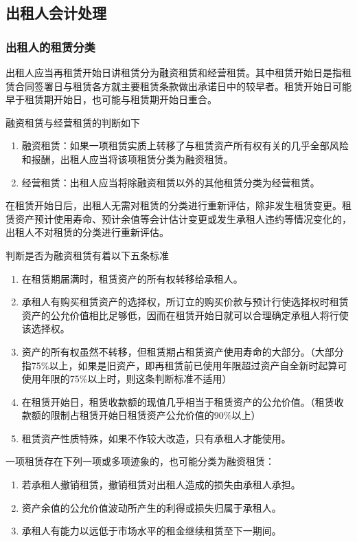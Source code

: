 \documentclass[UTF8,12pt]{ctexart}
\numberwithin{equation}{section} %
\numberwithin{figure}{section}
\numberwithin{table}{section}
\begin{document}
	\subsection{出租人会计处理}
	\subsubsection{出租人的租赁分类}
	出租人应当再租赁开始日讲租赁分为融资租赁和经营租赁。其中租赁开始日是指租赁合同签署日与租赁各方就主要租赁条款做出承诺日中的较早者。租赁开始日可能早于租赁期开始日，也可能与租赁期开始日重合。
	
	融资租赁与经营租赁的判断如下
	\begin{enumerate}
		\item 融资租赁：如果一项租赁实质上转移了与租赁资产所有权有关的几乎全部风险和报酬，出租人应当将该项租赁分类为融资租赁。
		
		\item 经营租赁：出租人应当将除融资租赁以外的其他租赁分类为经营租赁。
	\end{enumerate}
	在租赁开始日后，出租人无需对租赁的分类进行重新评估，除非发生租赁变更。租赁资产预计使用寿命、预计余值等会计估计变更或发生承租人违约等情况变化的，出租人不对租赁的分类进行重新评估。
	
	判断是否为融资租赁有着以下五条标准
	\begin{enumerate}
		\item 在租赁期届满时，租赁资产的所有权转移给承租人。
		
		\item 承租人有购买租赁资产的选择权，所订立的购买价款与预计行使选择权时租赁资产的公允价值相比足够低，因而在租赁开始日就可以合理确定承租人将行使该选择权。
		
		\item 资产的所有权虽然不转移，但租赁期占租赁资产使用寿命的大部分。（大部分指75\%以上，如果是旧资产，即再租赁前已使用年限超过资产自全新时起算可使用年限的75\%以上时，则这条判断标准不适用）
		
		\item 在租赁开始日，租赁收款额的现值几乎相当于租赁资产的公允价值。（租赁收款额的限制占租赁开始日租赁资产公允价值的90\%以上）
		
		\item 租赁资产性质特殊，如果不作较大改造，只有承租人才能使用。
	\end{enumerate}

	一项租赁存在下列一项或多项迹象的，也可能分类为融资租赁：
	\begin{enumerate}
		\item 若承租人撤销租赁，撤销租赁对出租人造成的损失由承租人承担。
		
		\item 资产余值的公允价值波动所产生的利得或损失归属于承租人。
		
		\item 承租人有能力以远低于市场水平的租金继续租赁至下一期间。
	\end{enumerate}
	
\end{document}
